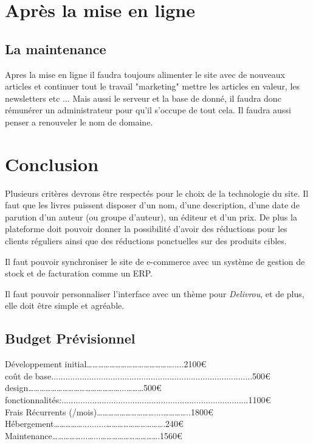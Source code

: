 \documentclass[a4paper,12pt]{report}
\begin{document}
\chapter{Après la mise en ligne}
\section{La maintenance}
Apres la mise en ligne il faudra toujours alimenter le site avec de nouveaux articles
et continuer tout le travail "marketing" mettre les articles en valeur, les newsletters etc ...
Mais aussi le serveur et la base de donné, il faudra donc rémunérer un administrateur pour qu'il
s'occupe de tout cela. Il faudra aussi penser a renouveler le nom de domaine.

\chapter{Conclusion}
Plusieurs critères devrons être respectés pour le choix de la technologie du
site.
Il faut que les livres puissent disposer d'un nom, d'une description, d'une
date de parution d'un auteur (ou groupe d'auteur), un éditeur et d'un prix.
De plus la plateforme doit pouvoir donner la possibilité d'avoir des
réductions pour les clients réguliers ainsi que des réductions ponctuelles sur
des produits cibles.

Il faut pouvoir synchroniser le site de e-commerce avec un système de gestion
de stock et de facturation comme un ERP.

Il faut pouvoir personnaliser l'interface avec un thème pour
\textit{Delivrou}, et de plus, elle doit être simple et agréable.

\newpage
\section{Budget Prévisionnel}
Développement initial……………………………………….....2100\euro  \\
\hangindent=1.5cm coût de base.....................................................................................500\euro  \\
design…………………………………………...………500\euro  \\
fonctionnalités:...............................................................................1100\euro  \\

Frais Récurrents (/mois)…………………………....…………..1800\euro  \\
\hangindent=1.5cm Hébergement……………..........………………………….240\euro  \\
Maintenance……………...…...………………………….1560\euro  \\
\end{document}
